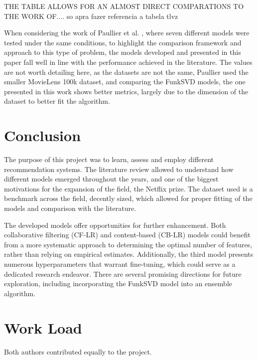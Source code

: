 \documentclass[conference]{IEEEtran}
\begin{document}
THE TABLE ALLOWS FOR AN ALMOST DIRECT COMPARATIONS TO THE WORK OF.... so apra fazer referencia a tabela tlvz

When considering the work of Paullier et al. \cite{9379914}, where seven different models were tested under the same conditions, to highlight the comparison framework and approach to this type of problem, the models developed and presented in this paper fall well in line with the performance achieved in the literature. The values are not worth detailing here, as the datasets are not the same, Paullier used the smaller MovieLens 100k dataset, and comparing the FunkSVD models, the one presented in this work shows better metrics, largely due to the dimension of the dataset to better fit the algorithm.

\section{Conclusion}

The purpose of this project was to learn, assess and employ different recommendation systems. The literature review allowed to understand how different models emerged throughout the years, and one of the biggest motivations for the expansion of the field, the Netflix prize. The dataset used is a benchmark across the field, decently sized, which allowed for proper fitting of the models and comparison with the literature.

The developed models offer opportunities for further enhancement. Both collaborative filtering (CF-LR) and content-based (CB-LR) models could benefit from a more systematic approach to determining the optimal number of features, rather than relying on empirical estimates. Additionally, the third model presents numerous hyperparameters that warrant fine-tuning, which could serve as a dedicated research endeavor. There are several promising directions for future exploration, including incorporating the FunkSVD model into an ensemble algorithm.


\section*{Work Load}

Both authors contributed equally to the project.



\end{document}
